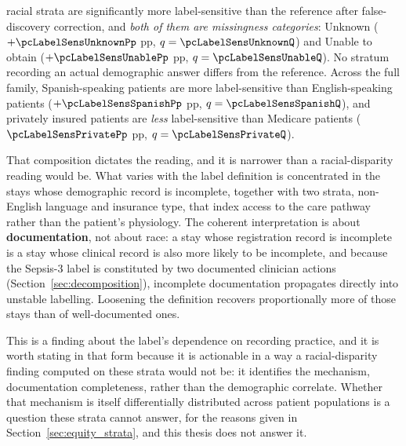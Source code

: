 \begin{table}[H]
    \centering\footnotesize
    \caption{Difference in label sensitivity (A--C range) against the reference
    group (White). $q_{\text{BH}}$ is adjusted over exploratory family E2, all
    18 label-sensitivity contrasts across race, language and insurance. Two
    racial contrasts survive at $q < 0.05$; across the full family,
    \pcLabelSensNSig{} do (adding Spanish-speaking patients,
    $+\pcLabelSensSpanishPp$ pp, $q = \pcLabelSensSpanishQ$, and privately
    insured patients, $\pcLabelSensPrivatePp$ pp,
    $q = \pcLabelSensPrivateQ$). \textbf{[E] exploratory.}}
    \label{tab:equity_label_contrasts}
\end{table}

\pcLabelSensNSigRace{} racial strata are significantly more label-sensitive
than the reference after false-discovery correction, and \emph{both of them are
missingness categories}: Unknown ($+\pcLabelSensUnknownPp$ pp,
$q = \pcLabelSensUnknownQ$) and Unable to obtain ($+\pcLabelSensUnablePp$ pp,
$q = \pcLabelSensUnableQ$). No stratum recording an actual demographic answer
differs from the reference. Across the full family, Spanish-speaking patients
are more label-sensitive than English-speaking patients
($+\pcLabelSensSpanishPp$ pp, $q = \pcLabelSensSpanishQ$), and privately
insured patients are \emph{less} label-sensitive than Medicare patients
($\pcLabelSensPrivatePp$ pp, $q = \pcLabelSensPrivateQ$).

That composition dictates the reading, and it is narrower than a
racial-disparity reading would be. What varies with the label definition is
concentrated in the stays whose demographic record is incomplete, together with
two strata, non-English language and insurance type, that index access to
the care pathway rather than the patient's physiology. The coherent
interpretation is about \textbf{documentation}, not about race: a stay whose
registration record is incomplete is a stay whose clinical record is also more
likely to be incomplete, and because the Sepsis-3 label is constituted by two
documented clinician actions (Section~\ref{sec:decomposition}), incomplete
documentation propagates directly into unstable labelling. Loosening the
definition recovers proportionally more of those stays than of well-documented
ones.

This is a finding about the label's dependence on recording practice, and it is
worth stating in that form because it is actionable in a way a racial-disparity
finding computed on these strata would not be: it identifies the mechanism, documentation completeness, rather than the demographic correlate. Whether
that mechanism is itself differentially distributed across patient populations
is a question these strata cannot answer, for the reasons given in
Section~\ref{sec:equity_strata}, and this thesis does not answer it.


